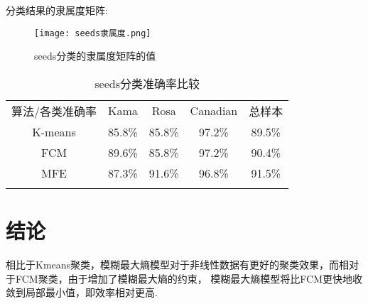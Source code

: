 \newpage
分类结果的隶属度矩阵:
\begin{figure}[!ht]
    \centering
    \texttt{[image: seeds隶属度.png]}
    \caption{seeds分类的隶属度矩阵的值}
    \label{seeds隶属度}
\end{figure}

\begin{table}[!ht]
    \label{seeds准确率比较}
    \caption{seeds分类准确率比较}
    \centering
    \begin{tabular}{c|c c c c}
        \whline 算法/各类准确率 & Kama  & Rosa & Canadian & 总样本 \\\whline
        K-means                 & 85.8\% & 85.8\% & 97.2\%     & 89.5\% \\
        FCM                     & 89.6\% & 85.8\% & 97.2\%     & 90.4\%   \\
        MFE                     & 87.3\% & 91.6\% & 96.8\%     & 91.5\% \\
        \whline
    \end{tabular}
    \label{seeds算法比较}
\end{table}
\section{结论}
    相比于Kmeans聚类，模糊最大熵模型对于非线性数据有更好的聚类效果，而相对于FCM聚类，由于增加了模糊最大熵的约束，
模糊最大熵模型将比FCM更快地收敛到局部最小值，即效率相对更高.